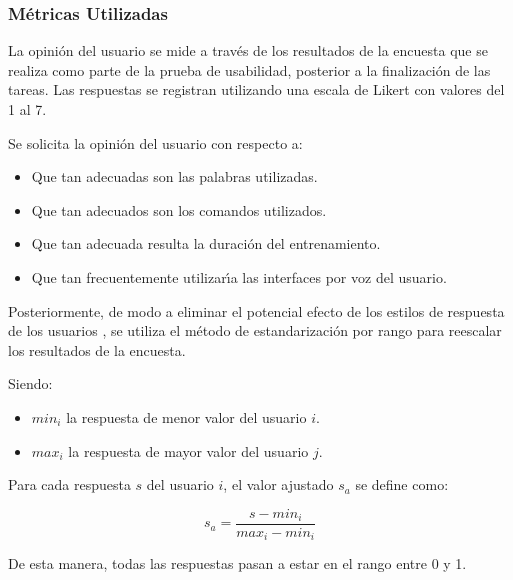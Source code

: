 \subsubsection{M\'etricas Utilizadas}
La opini\'on del usuario se mide a trav\'es de los resultados de la encuesta que se realiza como parte de
la prueba de usabilidad, posterior a la finalizaci\'on de las tareas. Las respuestas se
registran utilizando una escala de Likert \cite{Allen:2007} con valores del 1 al 7.

Se solicita la opini\'on del usuario con respecto a:
\begin{itemize}
	\item Que tan adecuadas son las palabras utilizadas.
	\item Que tan adecuados son los comandos utilizados.
	\item Que tan adecuada resulta la duraci\'on del entrenamiento.
	\item Que tan frecuentemente utilizar{\'\i}a las interfaces por voz del usuario.
\end{itemize}

Posteriormente, de modo a eliminar el potencial efecto de los estilos de respuesta
de los usuarios \cite{Fischer2010}, se utiliza el m\'etodo de estandarizaci\'on 
por rango \cite{Pagolu2011} para reescalar los resultados de la encuesta.

Siendo:
\begin{itemize}
	\item $min_i$ la respuesta de menor valor del usuario $i$.
	\item $max_i$ la respuesta de mayor valor del usuario $j$.
\end{itemize}

Para cada respuesta $s$ del usuario $i$, el valor ajustado $s_a$ se define como:

\begin{equation*}
s_a=\frac{s-min_i}{max_i-min_i}
\end{equation*}


De esta manera, todas las respuestas pasan a estar en el rango entre 0 y 1.  




